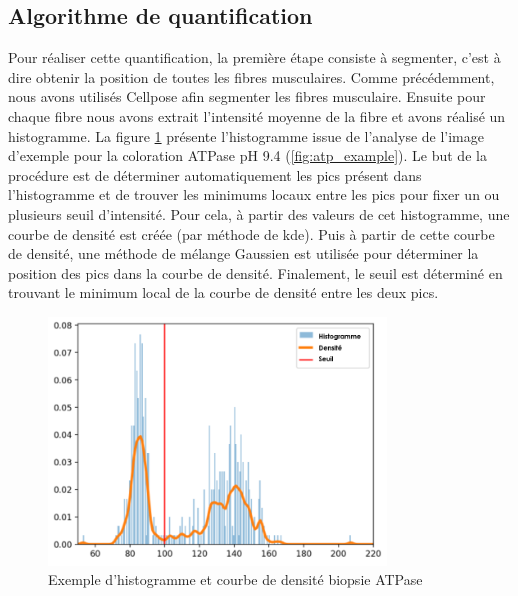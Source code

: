 \subsection{Algorithme de quantification}
Pour réaliser cette quantification, la première étape consiste à segmenter, c'est à dire obtenir la position de toutes les fibres musculaires. Comme précédemment, nous avons utilisés Cellpose afin segmenter les fibres musculaire. Ensuite pour chaque fibre nous avons extrait l'intensité moyenne de la fibre et avons réalisé un histogramme. La figure \ref{fig:atp_density} présente l'histogramme issue de l'analyse de l'image d'exemple pour la coloration ATPase pH 9.4 (\ref{fig:atp_example}). Le but de la procédure est de déterminer automatiquement les pics présent dans l'histogramme et de trouver les minimums locaux entre les pics pour fixer un ou plusieurs seuil d'intensité. Pour cela, à partir des valeurs de cet histogramme, une courbe de densité est créée (par méthode de \gls{kde}). Puis à partir de cette courbe de densité, une méthode de mélange Gaussien est utilisée pour déterminer la position des pics dans la courbe de densité. Finalement, le seuil est déterminé en trouvant le minimum local de la courbe de densité entre les deux pics.
\begin{figure}[htbp]
 \centering
 \includegraphics[width=0.8\textwidth]{figures/density_plot.png}
 \caption[Exemple d'histogramme et courbe de densité biopsie ATPase]{Exemple d'histogramme et courbe de densité biopsie ATPase}
 \label{fig:atp_density}
\end{figure}


